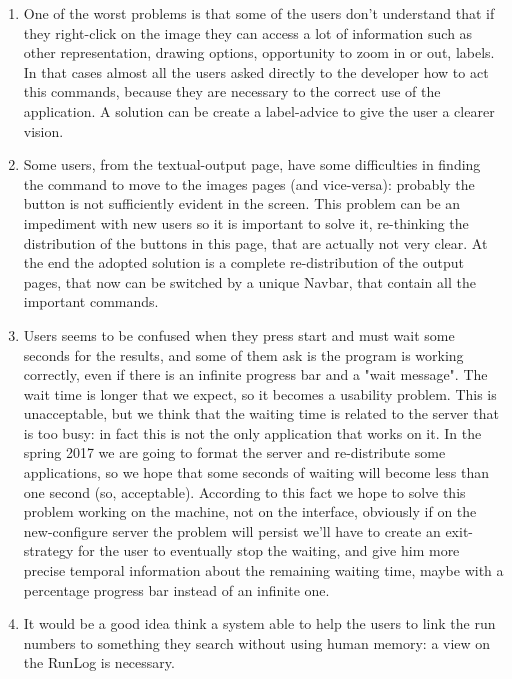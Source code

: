 \begin{enumerate}
\item 
One of the worst problems is that some of the users don't understand that if they right-click on the image they can access a lot of information such as other representation, drawing options, opportunity to zoom in or out, labels. In that cases almost all the users asked directly to the developer how to act this commands, because they are necessary to the correct use of the application. A solution can be create a label-advice to give the user a clearer vision.

\item
Some users, from the textual-output page, have some difficulties in finding the command to move to the images pages (and vice-versa): probably the button is not sufficiently evident in the screen. This problem can be an impediment with new users so it is important to solve it, re-thinking the distribution of the buttons in this page, that are actually not very clear. At the end the adopted solution is a complete re-distribution of the output pages, that now can be switched by a unique Navbar, that contain all the important commands.

\item
Users seems to be confused when they press start and must wait some seconds for the results, and some of them ask is the program is working correctly, even if there is an infinite progress bar and a "wait message". The wait time is longer that we expect, so it becomes a usability problem. This is unacceptable, but we think that the waiting time is related to the server that is too busy: in fact this is not the only application that works on it. In the spring 2017 we are going to format the server and re-distribute some applications, so we hope that some seconds of waiting will become less than one second (so, acceptable). According to this fact we hope to solve this problem working on the machine, not on the interface, obviously if on the new-configure server the problem will persist we'll have to create an exit-strategy for the user to eventually stop the waiting, and give him more precise temporal information about the remaining waiting time, maybe with a percentage progress bar instead of an infinite one.

\item 
It would be a good idea think a system able to help the users to link the run numbers to something they search without using human memory: a view on the RunLog is necessary.

\end{enumerate}

